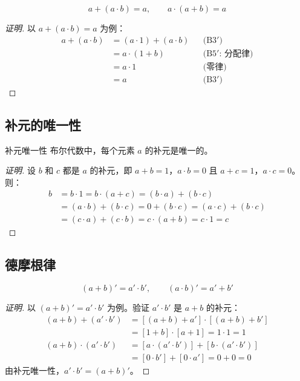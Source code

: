 \begin{myformula}
\[
a + (a\cdot b) = a, \qquad a\cdot(a+b) = a
\]
\end{myformula}

\begin{proof}[证明]
以 \(a+(a\cdot b)=a\) 为例：
\[
\begin{aligned}
a + (a\cdot b) &= (a\cdot 1) + (a\cdot b)    && \text{(B3$'$)} \\
               &= a\cdot(1+b)                && \text{(B5$'$: 分配律)} \\
               &= a\cdot 1                   && \text{(零律)} \\
               &= a                          && \text{(B3$'$)}
\end{aligned}
\]
\end{proof}

\subsection{补元的唯一性}

\begin{myTheorem}{补元唯一性}
布尔代数中，每个元素 \(a\) 的补元是唯一的。
\end{myTheorem}

\begin{proof}[证明]
设 \(b\) 和 \(c\) 都是 \(a\) 的补元，即 \(a+b=1\)，\(a\cdot b=0\) 且 \(a+c=1\)，\(a\cdot c=0\)。则：
\[
\begin{aligned}
b &= b\cdot 1 = b\cdot(a+c) = (b\cdot a)+(b\cdot c) \\
  &= (a\cdot b)+(b\cdot c) = 0+(b\cdot c) = (a\cdot c)+(b\cdot c) \\
  &= (c\cdot a)+(c\cdot b) = c\cdot(a+b) = c\cdot 1 = c
\end{aligned}
\]
\end{proof}

\subsection{德摩根律}

\begin{myformula}
\[
(a+b)' = a'\cdot b', \qquad (a\cdot b)' = a' + b'
\]
\end{myformula}

\begin{proof}[证明]
以 \((a+b)' = a'\cdot b'\) 为例。验证 \(a'\cdot b'\) 是 \(a+b\) 的补元：
\[
\begin{aligned}
(a+b)+(a'\cdot b') &= [(a+b)+a']\cdot[(a+b)+b'] \\
                   &= [1+b]\cdot[a+1] = 1\cdot 1 = 1 \\[4pt]
(a+b)\cdot(a'\cdot b') &= [a\cdot(a'\cdot b')] + [b\cdot(a'\cdot b')] \\
                        &= [0\cdot b'] + [0\cdot a'] = 0 + 0 = 0
\end{aligned}
\]
由补元唯一性，\(a'\cdot b' = (a+b)'\)。
\end{proof}

